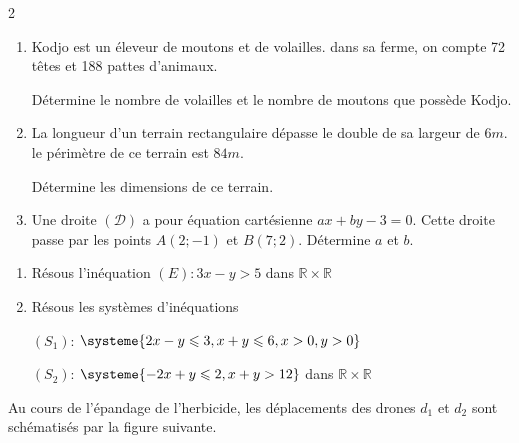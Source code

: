\begin{multicols*}{2}
\begin{enumerate}
  		Détermine le nombre de livres de chaque sorte.
  		\item  Kodjo est un éleveur de moutons et de volailles. dans sa ferme, on compte 72 têtes et 188 pattes d'animaux. 
  		
  		Détermine le nombre de volailles et le nombre de moutons que possède Kodjo.
  		\item La longueur d'un terrain rectangulaire dépasse le double de sa largeur de $6 m$. le périmètre de ce terrain est $84 m$.
  		
  		Détermine les dimensions de ce terrain.
  		\item   Une droite $(\mathcal{D})$ a pour équation cartésienne $ax+by-3=0$. Cette droite passe par les points $A(2;-1)$	 et $B(7;2)$. Détermine $a$ et $b$.
  	\end{enumerate}
  	\begin{center}
  	\end{center}
  	\begin{enumerate}
  		\item Résous l'inéquation   $(E): 3x-y>5$ dans $\mathbb{R}\times \mathbb{R}$
  		\item Résous les systèmes d'inéquations 
  		
  		$(S_{1})$: $\systeme{2x-y\leqslant3, x+y\leqslant6,x>0,y>0}$    
  		
  		$(S_{2})$: $\systeme{-2x+y\leqslant2, x+y>12 }$ dans $\mathbb{R}\times \mathbb{R}$
  	\end{enumerate}
  	
  	\setcounter{q}{0}
  	
  	Au cours de l’épandage de l’herbicide, les déplacements des drones $d_{1}$ et $d_{2}$ sont schématisés par la figure suivante.
  	

\end{multicols*}

